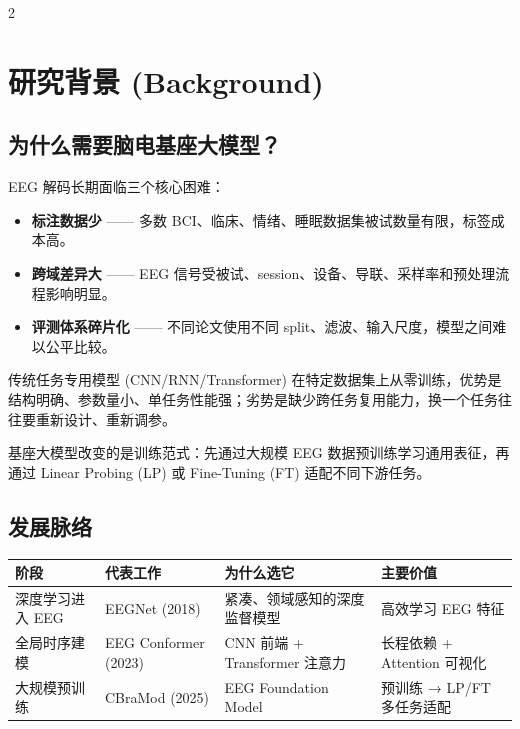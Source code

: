 \documentclass[12pt, a0paper]{article}
\begin{document}
\begin{multicols}{2}

\section{研究背景 (Background)}

\subsection{为什么需要脑电基座大模型？}

EEG 解码长期面临三个核心困难：

\begin{itemize}
    \item \textbf{标注数据少} —— 多数 BCI、临床、情绪、睡眠数据集被试数量有限，标签成本高。
    \item \textbf{跨域差异大} —— EEG 信号受被试、session、设备、导联、采样率和预处理流程影响明显。
    \item \textbf{评测体系碎片化} —— 不同论文使用不同 split、滤波、输入尺度，模型之间难以公平比较。
\end{itemize}

传统任务专用模型 (CNN/RNN/Transformer) 在特定数据集上从零训练，优势是结构明确、参数量小、单任务性能强；劣势是缺少跨任务复用能力，换一个任务往往要重新设计、重新调参。

基座大模型改变的是训练范式：先通过大规模 EEG 数据预训练学习通用表征，再通过 Linear Probing (LP) 或 Fine-Tuning (FT) 适配不同下游任务。

\subsection{发展脉络}

\begin{center}
\begin{tabular}{llll}
    \toprule
    \textbf{阶段} & \textbf{代表工作} & \textbf{为什么选它} & \textbf{主要价值} \\
    \midrule
    深度学习进入 EEG & EEGNet (2018) & 紧凑、领域感知的深度监督模型 & 高效学习 EEG 特征 \\
    全局时序建模 & EEG Conformer (2023) & CNN 前端 + Transformer 注意力 & 长程依赖 + Attention 可视化 \\
    大规模预训练 & CBraMod (2025) & EEG Foundation Model & 预训练 → LP/FT 多任务适配 \\
    \bottomrule
\end{tabular}
\end{center}


\end{multicols}
\end{document}
